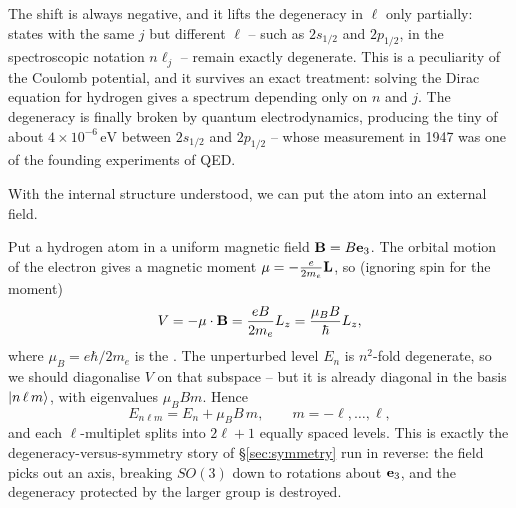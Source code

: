 \documentclass[a4paper]{scrartcl}
\newcommand{\Ry}{\mathrm{Ry}}
\begin{document}
The shift is always negative, and it lifts the degeneracy in $\ell$ only partially: states with the same $j$ but different $\ell$ -- such as $2s_{1/2}$ and $2p_{1/2}$, in the spectroscopic notation $n\ell_j$ -- remain exactly degenerate. This is a peculiarity of the Coulomb potential, and it survives an exact treatment: solving the Dirac equation for hydrogen gives a spectrum depending only on $n$ and $j$. The degeneracy is finally broken by quantum electrodynamics, producing the tiny  of about $4\times10^{-6}\,\mathrm{eV}$ between $2s_{1/2}$ and $2p_{1/2}$ -- whose measurement in 1947 was one of the founding experiments of QED.

\begin{center}
\end{center}

With the internal structure understood, we can put the atom into an external field.

\begin{example}
    Put a hydrogen atom in a uniform magnetic field $\mathbf{B} = B \mathbf{e}_3$. The orbital motion of the electron gives a magnetic moment $\mathbf{\mu} = -\frac{e}{2m_e}\mathbf{L}$, so (ignoring spin for the moment)
    $$
    V = -\mathbf{\mu}\cdot\mathbf{B} = \frac{eB}{2m_e}L_z = \frac{\mu_B B}{\hbar}L_z,
    $$
    where $\mu_B = e\hbar/2m_e$ is the . The unperturbed level $E_n$ is $n^2$-fold degenerate, so we should diagonalise $V$ on that subspace -- but it is already diagonal in the basis $\ket{n\,\ell\,m}$, with eigenvalues $\mu_B B m$. Hence
    $$
    E_{n\ell m} = E_n + \mu_B B\, m, \qquad m = -\ell,\dots,\ell,
    $$
    and each $\ell$-multiplet splits into $2\ell+1$ equally spaced levels. This is exactly the degeneracy-versus-symmetry story of \S\ref{sec:symmetry} run in reverse: the field picks out an axis, breaking $SO(3)$ down to rotations about $\mathbf{e}_3$, and the degeneracy protected by the larger group is destroyed.
\end{example}
\end{document}
